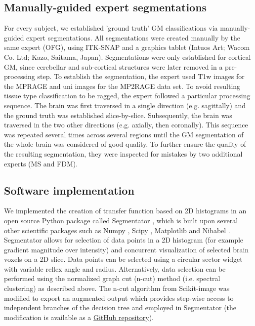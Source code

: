 \subsection{Manually-guided expert segmentations}
For every subject, we established 'ground truth' GM classifications via manually-guided expert segmentations. All segmentations were created manually by the same expert (OFG), using ITK-SNAP \parencite{py06nimg} and a graphics tablet (Intuos Art; Wacom Co. Ltd; Kazo, Saitama, Japan). Segmentations were only established for cortical GM, since cerebellar and sub-cortical structures were later removed in a pre-processing step. To establish the segmentation, the expert used T1w images for the MPRAGE and uni images for the MP2RAGE data set. To avoid resulting tissue type classification to be ragged, the expert followed a particular processing sequence. The brain was first traversed in a single direction (e.g. sagittally) and the ground truth was established slice-by-slice. Subsequently, the brain was traversed in the two other directions (e.g. axially, then coronally). This sequence was repeated several times across several regions until the GM segmentation of the whole brain was considered of good quality. To further ensure the quality of the resulting segmentation, they were inspected for mistakes by two additional experts (MS and FDM).

\subsection{Software implementation}
We implemented the creation of transfer function based on 2D histograms in an open source Python package called Segmentator \parencite*{segmentator_v1.5.0}, which is built upon several other scientific packages such as Numpy \parencite*{numpy2011}, Scipy \parencite*{scipy2001}, Matplotlib \parencite*{matplotlib2007} and Nibabel \parencite*{nibabel2017}. Segmentator allows for selection of data points in a 2D histogram (for example gradient magnitude over intensity) and concurrent visualization of selected brain voxels on a 2D slice. Data points can be selected using a circular sector widget with variable reflex angle and radius. Alternatively, data selection can be performed using the normalized graph cut (n-cut) method (i.e. spectral clustering) as described above. The n-cut algorithm from Scikit-image \parencite*{scikitimage2014} was modified to export an augmented output which provides step-wise access to independent branches of the decision tree and employed in Segmentator (the modification is available as a  \href{https://github.com/ofgulban/scikit-image/tree/ncut-rag-options}{GitHub repository}).

